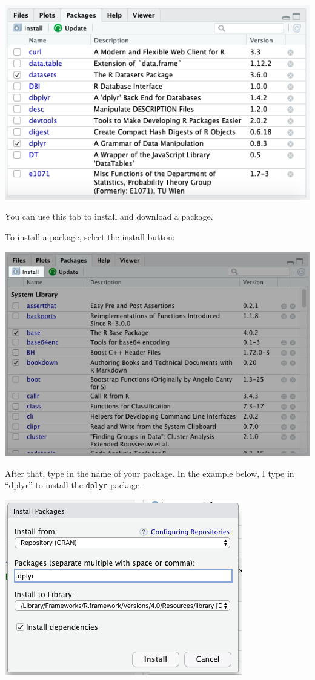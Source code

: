 \documentclass[
]{book}
\begin{document}
\begin{center}
\begin{center}\includegraphics[width=0.6\linewidth]{1.24_Packages} \end{center}

You can use this tab to install and download a package.

To install a package, select the install button:

\begin{center}\includegraphics[width=0.6\linewidth]{1.38_Install_Package} \end{center}

After that, type in the name of your package. In the example below, I type in ``dplyr'' to install the \texttt{dplyr} package.

\begin{center}\includegraphics[width=0.6\linewidth]{1.39_Install_Dplyr} \end{center}


\end{center}
\end{document}
